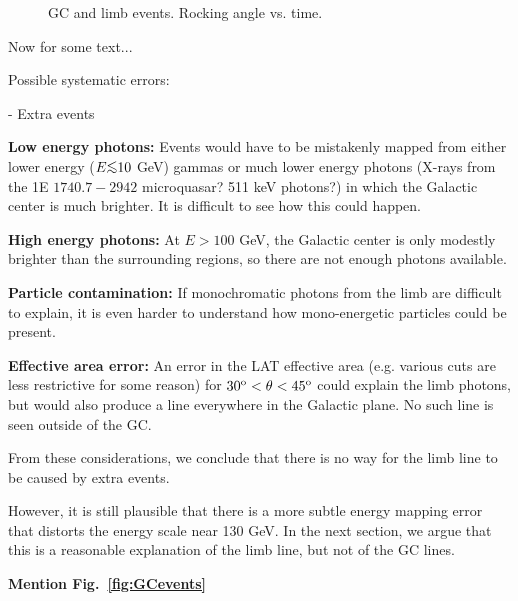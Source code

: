 \documentclass[aps,twocolumn,prd,superscriptaddress,showpacs,nofootinbib,fixfloat]{revtex4}
\newcommand{\degree}{^{\rm o}}
\def\la{\vcenter{\hbox{$<$}\offinterlineskip\hbox{$\sim$}}}
\begin{document}
\begin{figure}[p]
  \begin{center}
  \end{center}
  \caption{GC and limb events. Rocking angle vs. time.}
  \label{fig:rockTime}
\end{figure}

Now for some text...

Possible systematic errors:

- Extra events

{\bf Low energy photons:} Events would have to be mistakenly mapped from
either lower energy ($E \la 10$ GeV) gammas or much lower energy photons
(X-rays from the 1E $1740.7-2942$ microquasar?  511 keV photons?) in which the
Galactic center is much brighter.  It is difficult to see how this could
happen.

{\bf High energy photons:} At $E > 100$ GeV, the Galactic center is only
modestly brighter than the surrounding regions, so there are not enough
photons available.

{\bf Particle contamination:} If monochromatic photons from the limb are
difficult to explain, it is even harder to understand how mono-energetic
particles could be present. 

{\bf Effective area error:} An error in the LAT effective area (e.g. various
cuts are less restrictive for some reason) for $30\degree < \theta <
45\degree$ could explain the limb photons, but would also produce a line
everywhere in the Galactic plane.  No such line is seen outside of the GC. 

From these considerations, we conclude that there is no way for the limb line
to be caused by extra events. 

However, it is still plausible that there is a more subtle energy mapping
error that distorts the energy scale near 130 GeV.  In the next section, we
argue that this is a reasonable explanation of the limb line, but not of the
GC lines. 

\textbf{Mention Fig.~\ref{fig:GCevents}}
\end{document}
